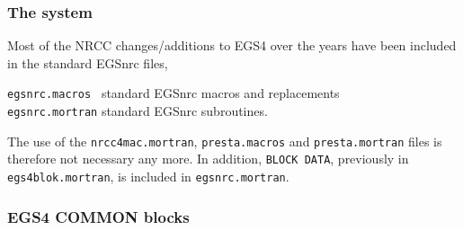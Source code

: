 \subsubsection{The system}

Most of the NRCC changes/additions to EGS4 over the years have been included 
in the standard EGSnrc files, 
\begin{flushleft}
{\tt egsnrc.macros~} \quad \quad standard EGSnrc macros and replacements\\
{\tt egsnrc.mortran} \quad \quad standard EGSnrc subroutines.
\end{flushleft}
The use of the {\tt nrcc4mac.mortran}, 
{\tt presta.macros} and {\tt presta.mortran} files is therefore 
not necessary any more. In addition, {\tt BLOCK DATA}, 
previously in {\tt egs4blok.mortran}, is included in {\tt egsnrc.mortran}.

\subsubsection{EGS4 COMMON blocks}

